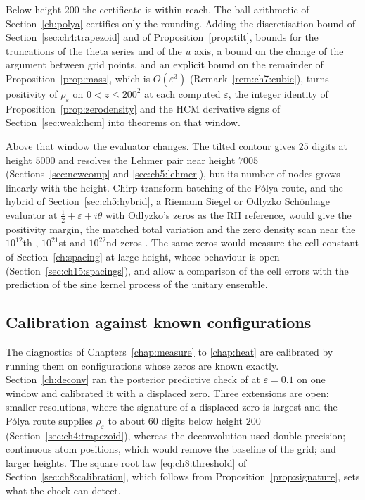 Below height $200$ the certificate is within reach. The ball arithmetic of Section~\ref{ch:polya} certifies only the rounding. Adding the discretisation bound of Section~\ref{sec:ch4:trapezoid} and of Proposition~\ref{prop:tilt}, bounds for the truncations of the theta series and of the $u$ axis, a bound on the change of the argument between grid points, and an explicit bound on the remainder of Proposition~\ref{prop:mass}, which is $O(\varepsilon^3)$ (Remark~\ref{rem:ch7:cubic}), turns positivity of $\rho_\varepsilon$ on $0<z\le200^2$ at each computed $\varepsilon$, the integer identity of Proposition~\ref{prop:zerodensity} and the HCM derivative signs of Section~\ref{sec:weak:hcm} into theorems on that window.

Above that window the evaluator changes. The tilted contour gives $25$ digits at height $5000$ and resolves the Lehmer pair near height $7005$ (Sections~\ref{sec:newcomp} and \ref{sec:ch5:lehmer}), but its number of nodes grows linearly with the height. Chirp transform batching of the P\'olya route, and the hybrid of Section~\ref{sec:ch5:hybrid}, a Riemann Siegel or Odlyzko Sch\"onhage evaluator at $\tfrac12+\varepsilon+i\theta$ with Odlyzko's zeros as the RH reference, would give the positivity margin, the matched total variation and the zero density scan near the $10^{12}$th \cite{Odlyzko87}, $10^{21}$st and $10^{22}$nd zeros \cite{Odlyzko01,OdlyzkoTables}. The same zeros would measure the cell constant of Section~\ref{ch:spacing} at large height, whose behaviour is open (Section~\ref{sec:ch15:spacings}), and allow a comparison of the cell errors with the prediction of the sine kernel process of the unitary ensemble.

\subsection{Calibration against known configurations}\label{sec:open:calib}

The diagnostics of Chapters~\ref{chap:measure} to \ref{chap:heat} are calibrated by running them on configurations whose zeros are known exactly. Section~\ref{ch:deconv} ran the posterior predictive check of \cite[Section 19.3.7]{P26} at $\varepsilon=0.1$ on one window and calibrated it with a displaced zero. Three extensions are open: smaller resolutions, where the signature of a displaced zero is largest and the P\'olya route supplies $\rho_\varepsilon$ to about $60$ digits below height $200$ (Section~\ref{sec:ch4:trapezoid}), whereas the deconvolution used double precision; continuous atom positions, which would remove the baseline of the grid; and larger heights. The square root law \eqref{eq:ch8:threshold} of Section~\ref{sec:ch8:calibration}, which follows from Proposition~\ref{prop:signature}, sets what the check can detect.

